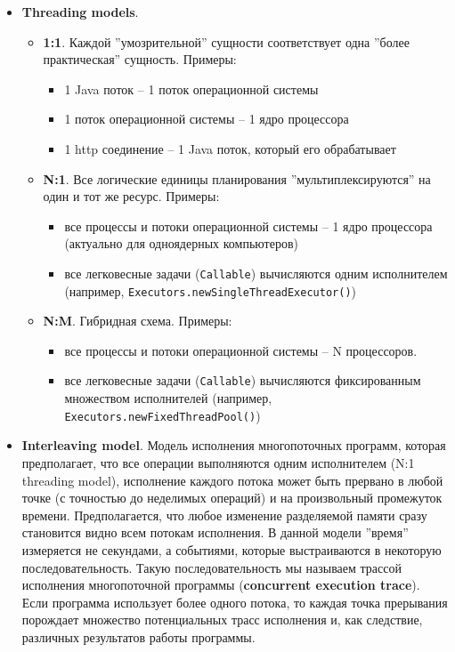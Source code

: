 \documentclass[a4paper, 12pt]{extarticle}
\begin{document}
\begin{itemize}
	\item \textbf{Threading models}.
	\begin{itemize}
		\item \textbf{1:1}. Каждой ''умозрительной'' сущности соответствует одна ''более практическая'' сущность. Примеры:
		\begin{itemize}
			\item 1 Java поток -- 1 поток операционной системы
			\item 1 поток операционной системы -- 1 ядро процессора
			\item 1 http соединение -- 1 Java поток, который его обрабатывает
		\end{itemize}
		
		\item \textbf{N:1}. Все логические единицы планирования ''мультиплексируются'' на один и тот же ресурс. Примеры:
		\begin{itemize}
			\item все процессы и потоки операционной системы -- 1 ядро процессора (актуально для одноядерных компьютеров)
			\item все легковесные задачи (\texttt{Callable}) вычисляются одним исполнителем (например, \texttt{Executors.newSingleThreadExecutor()})			
		\end{itemize}

		\item \textbf{N:M}. Гибридная схема. Примеры:
		\begin{itemize}
			\item все процессы и потоки операционной системы -- N процессоров.
			\item все легковесные задачи (\texttt{Callable}) вычисляются фиксированным множеством исполнителей (например, \texttt{Executors.newFixedThreadPool()})			
		\end{itemize}

	\end{itemize}

	\item \textbf{Interleaving model}. Модель исполнения многопоточных программ, которая предполагает, что все операции выполняются одним исполнителем (N:1 threading model), исполнение каждого потока может быть прервано в любой точке (с точностью до неделимых операций) и на произвольный промежуток времени. Предполагается, что любое изменение разделяемой памяти сразу становится видно всем потокам исполнения. В данной модели ''время'' измеряется не секундами, а событиями, которые выстраиваются в некоторую последовательность. Такую последовательность мы называем трассой исполнения многопоточной программы (\textbf{concurrent execution trace}). Если программа использует более одного потока, то каждая точка прерывания порождает множество потенциальных трасс исполнения и, как следствие, различных результатов работы программы. 


\end{itemize}
\end{document}
